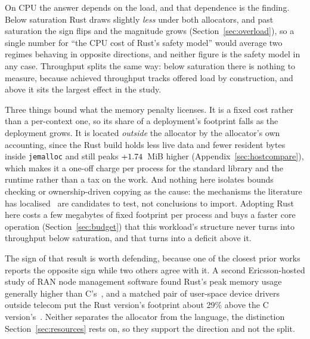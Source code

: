 \documentclass[english,oneside,a4paper,censored,csm,software-track-2020]{HYthesisML}
\begin{document}
On CPU the answer depends on the load, and that dependence is the finding. Below saturation Rust
draws slightly \emph{less} under both allocators, and past saturation the sign flips and the
magnitude grows (Section~\ref{sec:overload}), so a single number for ``the CPU cost of Rust's
safety model'' would average two regimes behaving in opposite directions, and neither figure is
the safety model in any case. Throughput splits the same way: below saturation there is nothing to
measure, because achieved throughput tracks offered load by construction, and above it sits the
largest effect in the study.

Three things bound what the memory penalty licenses. It is a fixed cost rather than a per-context
one, so its share of a deployment's footprint falls as the deployment grows. It is located
\emph{outside} the allocator by the allocator's own accounting, since the Rust build holds less
live data and fewer resident bytes inside \texttt{jemalloc} and still peaks $+1.74$~MiB
higher (Appendix~\ref{sec:hostcompare}), which makes it a one-off charge per process for the
standard library and the runtime rather than a tax on the work. And nothing here isolates bounds
checking or ownership-driven copying as the cause: the mechanisms the literature has
localised~\cite{zhang2022runtime,harris2023morello} are candidates to test, not conclusions to
import. Adopting Rust here costs a few megabytes of fixed footprint per process and buys a faster
core operation (Section~\ref{sec:budget}) that this workload's structure never turns into
throughput below saturation, and that turns into a deficit above it.

The sign of that result is worth defending, because one of the closest prior works reports the
opposite sign while two others agree with it. A second Ericsson-hosted study of RAN node
management software found Rust's peak memory usage generally higher than
C's~\cite{olsson2023ranmgmt}, and a matched pair of user-space device drivers outside telecom put
the Rust version's footprint about 29\% above the C version's~\cite{sundvisson2026drivers}.
Neither separates the allocator from the language, the distinction Section~\ref{sec:resources}
rests on, so they support the direction and not the split.
\end{document}
